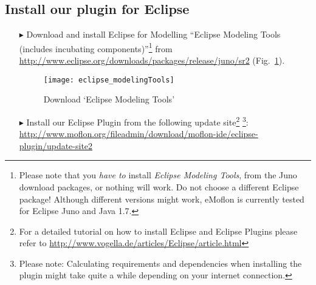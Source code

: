 \genHeader
{}

\subsection{Install our plugin for Eclipse}
 
 \vspace{0.5cm}
 
\begin{itemize}
\item[$\blacktriangleright$] Download\hypertarget{installPlugin common}{} and install Eclipse for Modelling ``Eclipse Modeling Tools (includes incubating
components)''\footnote{Please note that you \emph{have to} install \emph{Eclipse Modeling Tools}, from the Juno download packages, or nothing will work.  Do not
choose a different Eclipse package!  Although different versions might work, eMoflon is currently tested for Eclipse Juno and Java 1.7.} from
\url{http://www.eclipse.org/downloads/packages/release/juno/sr2} (Fig.~\ref{fig_downloadModelingPackage}).

\vspace{1.5cm}

\begin{figure}[htbp]
	\centering
  	\texttt{[image: eclipse\_modelingTools]}
	\caption{Download `Eclipse Modeling Tools'}
	\label{fig_downloadModelingPackage}
\end{figure}

\vspace{1cm}

\item[$\blacktriangleright$] Install our Eclipse Plugin from the following update site\footnote{For a detailed tutorial on how to install Eclipse and Eclipse
Plugins please refer to \url{http://www.vogella.de/articles/Eclipse/article.html}} \footnote{Please note: Calculating requirements and dependencies when
installing the plugin might take quite a while depending on your internet connection.}:
\url{http://www.moflon.org/fileadmin/download/moflon-ide/eclipse-plugin/update-site2}

\end{itemize}
